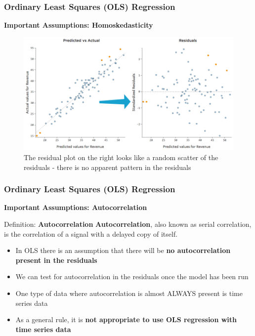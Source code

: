 \documentclass{beamer}
\begin{document}

\begin{frame}
\frametitle{Ordinary Least Squares (OLS) Regression}
\textbf{Important Assumptions: Homoskedasticity}\\
\vspace{0.3cm}
\begin{figure}
\includegraphics[scale=0.3]{homosked}
\caption{The residual plot on the right looks like a random scatter of the residuals - there is no apparent pattern in the residuals}
\end{figure}
\end{frame}

\begin{frame}
\frametitle{Ordinary Least Squares (OLS) Regression}
\textbf{Important Assumptions: Autocorrelation}\\
\vspace{0.3cm}
\begin{block}{Definition: \textbf{Autocorrelation}}
\textbf{Autocorrelation}, also known as serial correlation, is the correlation of a signal with a delayed copy of itself.
\end{block}
\begin{itemize}
\item In OLS there is an assumption that there will be \textbf{no autocorrelation present in the residuals}
\vspace{0.2cm}
\item We can test for autocorrelation in the residuals once the model has been run
\vspace{0.2cm}
\item One type of data where autocorrelation is almost ALWAYS present is time series data
\vspace{0.2cm}
\item As a general rule, it is \textbf{not appropriate to use OLS regression with time series data}
\end{itemize}
\end{frame}
\end{document}
